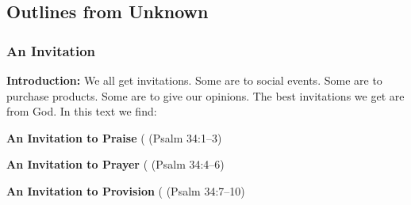 \subsection{Outlines from Unknown}

\subsubsection{An Invitation}
\textbf{Introduction: }We all get invitations. Some are to social events. Some are to purchase  products. Some are to give our opinions. The best invitations we get are from God. In this text we find:
\begin{compactenum}[I.]
    \item \textbf{An Invitation to Praise} ( (Psalm 34:1--3)
    \item \textbf{An Invitation to Prayer} ( (Psalm 34:4--6)
    \item \textbf{An Invitation to Provision} ( (Psalm 34:7--10)
\end{compactenum}

